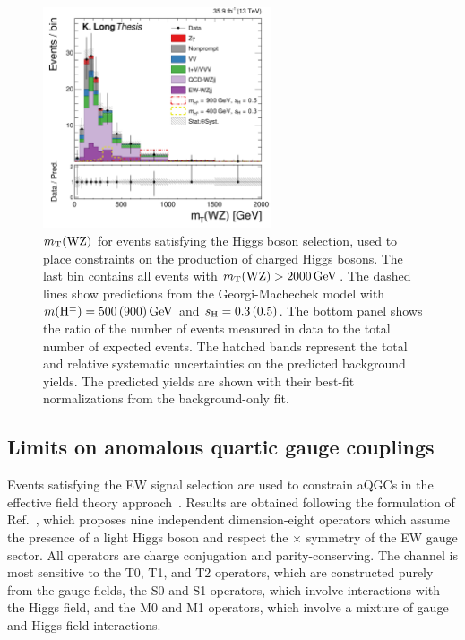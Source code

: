 \begin{figure}[htbp]
  \centering
    \includegraphics[width=0.6\textwidth]{figures/AnalysisProcedure/MTWZ_Higgs_expected.pdf}
  \caption{
      $m_{\mathrm{T}}(\mathrm{W}\mathrm{Z})$ for events satisfying the Higgs boson selection,
      used to place constraints on the production of charged Higgs bosons.
      The last bin contains all events with $m_{\mathrm{T}}(\mathrm{W}\mathrm{Z}) > 2000\,\text{Ge\hspace{-.08em}V}$.
      The dashed lines show predictions from the Georgi-Machechek model with
      $m(\mathrm{H}^{\pm}) = 500 \,(900)\,\text{Ge\hspace{-.08em}V}$ and $s_{\mathrm{H}} = 0.3 \,(0.5)$.
      The bottom panel shows the ratio of the number of events measured in data to the total 
      number of expected events. The hatched bands represent the total and relative 
      systematic uncertainties on the predicted background yields.
      The predicted yields are shown with their best-fit normalizations from the background-only fit.
      }
 \label{fig:higgsmtExp}
\end{figure}

\subsection{Limits on anomalous quartic gauge couplings}
\label{sec:aqgcProcedure}

Events satisfying the EW signal selection are used to constrain aQGCs in the effective field theory approach~\cite{Degrande:2012wf}.
Results are obtained following the formulation of Ref.~\cite{Eboli:2006wa}, which proposes
nine independent dimension-eight operators which assume the presence of a light Higgs boson and 
respect the {\SUtwo$\times$\Uone} symmetry of the EW gauge sector. All operators are
charge conjugation and parity-conserving.
The \WZjj channel is most sensitive to the 
T0, T1, and T2 operators, which are constructed purely from the {\SUtwo} gauge fields,
the S0 and S1 operators, which involve interactions with the Higgs field,
and the M0 and M1 operators, which involve a mixture of gauge and Higgs field interactions.

